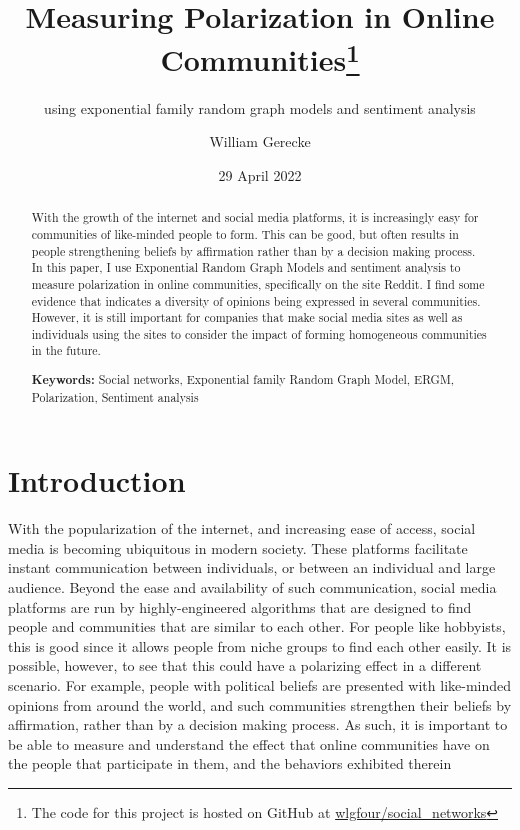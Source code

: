 \documentclass[
]{article}
\title{Measuring Polarization in Online Communities\thanks{The code for this project is hosted on GitHub at \href{https://github.com/wlgfour/social_networks}{wlgfour/social\_networks}}}
\subtitle{using exponential family random graph models and sentiment analysis}
\author{William Gerecke}
\date{29 April 2022}
\begin{document}
\maketitle
\begin{abstract}
With the growth of the internet and social media platforms, it is increasingly easy for communities of like-minded people to form. This can be good, but often results in people strengthening beliefs by affirmation rather than by a decision making process. In this paper, I use Exponential Random Graph Models and sentiment analysis to measure polarization in online communities, specifically on the site Reddit. I find some evidence that indicates a diversity of opinions being expressed in several communities. However, it is still important for companies that make social media sites as well as individuals using the sites to consider the impact of forming homogeneous communities in the future.

\par

\textbf {Keywords:} Social networks, Exponential family Random Graph Model, ERGM, Polarization, Sentiment analysis
\end{abstract}

\newpage
\tableofcontents

\newpage

\hypertarget{introduction}{%
\section{Introduction}\label{introduction}}

With the popularization of the internet, and increasing ease of access, social media is becoming ubiquitous in modern society. These platforms facilitate instant communication between individuals, or between an individual and large audience. Beyond the ease and availability of such communication, social media platforms are run by highly-engineered algorithms that are designed to find people and communities that are similar to each other. For people like hobbyists, this is good since it allows people from niche groups to find each other easily. It is possible, however, to see that this could have a polarizing effect in a different scenario. For example, people with political beliefs are presented with like-minded opinions from around the world, and such communities strengthen their beliefs by affirmation, rather than by a decision making process. As such, it is important to be able to measure and understand the effect that online communities have on the people that participate in them, and the behaviors exhibited therein
\end{document}
